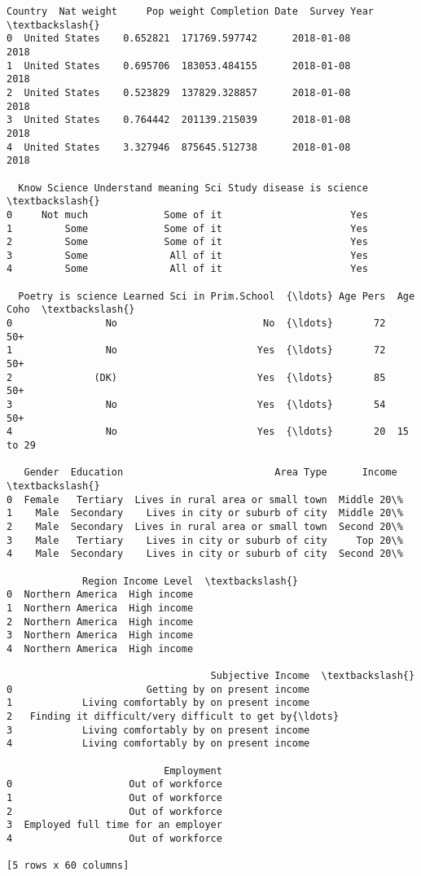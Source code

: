 \documentclass[11pt]{article}
\makeatletter
\newcommand{\boxspacing}{\kern\kvtcb@left@rule\kern\kvtcb@boxsep}
\newcommand{\prompt}[4]{
        {\ttfamily\llap{{\color{#2}[#3]:\hspace{3pt}#4}}\vspace{-\baselineskip}}
    }
\makeatother
\begin{document}
            \begin{tcolorbox}[breakable, size=fbox, boxrule=.5pt, pad at break*=1mm, opacityfill=0]
\prompt{Out}{outcolor}{29}{\boxspacing}
\begin{Verbatim}[commandchars=\\\{\}]
         Country  Nat weight     Pop weight Completion Date  Survey Year  \textbackslash{}
0  United States    0.652821  171769.597742      2018-01-08         2018
1  United States    0.695706  183053.484155      2018-01-08         2018
2  United States    0.523829  137829.328857      2018-01-08         2018
3  United States    0.764442  201139.215039      2018-01-08         2018
4  United States    3.327946  875645.512738      2018-01-08         2018

  Know Science Understand meaning Sci Study disease is science  \textbackslash{}
0     Not much             Some of it                      Yes
1         Some             Some of it                      Yes
2         Some             Some of it                      Yes
3         Some              All of it                      Yes
4         Some              All of it                      Yes

  Poetry is science Learned Sci in Prim.School  {\ldots} Age Pers  Age Coho  \textbackslash{}
0                No                         No  {\ldots}       72       50+
1                No                        Yes  {\ldots}       72       50+
2              (DK)                        Yes  {\ldots}       85       50+
3                No                        Yes  {\ldots}       54       50+
4                No                        Yes  {\ldots}       20  15 to 29

   Gender  Education                          Area Type      Income  \textbackslash{}
0  Female   Tertiary  Lives in rural area or small town  Middle 20\%
1    Male  Secondary    Lives in city or suburb of city  Middle 20\%
2    Male  Secondary  Lives in rural area or small town  Second 20\%
3    Male   Tertiary    Lives in city or suburb of city     Top 20\%
4    Male  Secondary    Lives in city or suburb of city  Second 20\%

             Region Income Level  \textbackslash{}
0  Northern America  High income
1  Northern America  High income
2  Northern America  High income
3  Northern America  High income
4  Northern America  High income

                                   Subjective Income  \textbackslash{}
0                       Getting by on present income
1            Living comfortably by on present income
2   Finding it difficult/very difficult to get by{\ldots}
3            Living comfortably by on present income
4            Living comfortably by on present income

                           Employment
0                    Out of workforce
1                    Out of workforce
2                    Out of workforce
3  Employed full time for an employer
4                    Out of workforce

[5 rows x 60 columns]
\end{Verbatim}
\end{tcolorbox}
        
\end{document}
